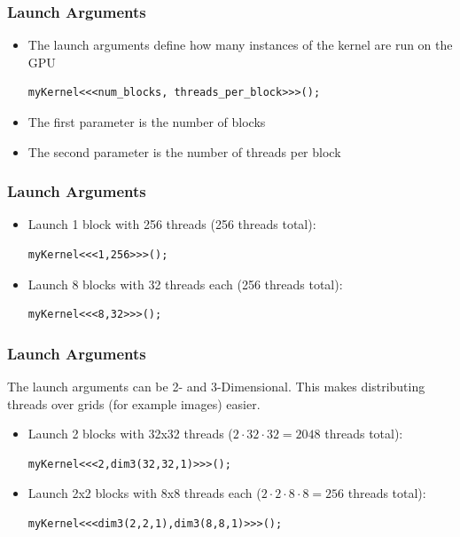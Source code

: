 \documentclass[aspectratio=169]{beamer}
\begin{document}
\begin{frame}[fragile]
	\frametitle{Launch Arguments}
	\begin{itemize}
		\item The launch arguments define how many instances of the kernel are run on the GPU
\begin{lstlisting}
myKernel<<<num_blocks, threads_per_block>>>();
\end{lstlisting}
		\item The first parameter is the number of blocks
		\item The second parameter is the number of threads per block
	\end{itemize}
\end{frame}

\begin{frame}[fragile]
	\frametitle{Launch Arguments}
	\begin{itemize}
		\item Launch 1 block with 256 threads (256 threads total):
\begin{lstlisting}
myKernel<<<1,256>>>();
\end{lstlisting}
		\item Launch 8 blocks with 32 threads each (256 threads total):
\begin{lstlisting}
myKernel<<<8,32>>>();
\end{lstlisting}
	\end{itemize}
\end{frame}

\begin{frame}[fragile]
	\frametitle{Launch Arguments}
	The launch arguments can be 2- and 3-Dimensional. This makes distributing threads over grids (for example images) easier.
	\begin{itemize}
		\item Launch 2 blocks with 32x32 threads ($2 \cdot 32 \cdot 32 = 2048$ threads total):
\begin{lstlisting}
myKernel<<<2,dim3(32,32,1)>>>();
\end{lstlisting}
		\item Launch 2x2 blocks with 8x8 threads each ($2\cdot 2 \cdot 8 \cdot 8 = 256$ threads total):
\begin{lstlisting}
myKernel<<<dim3(2,2,1),dim3(8,8,1)>>>();
\end{lstlisting}
	\end{itemize}
\end{frame}
\end{document}

